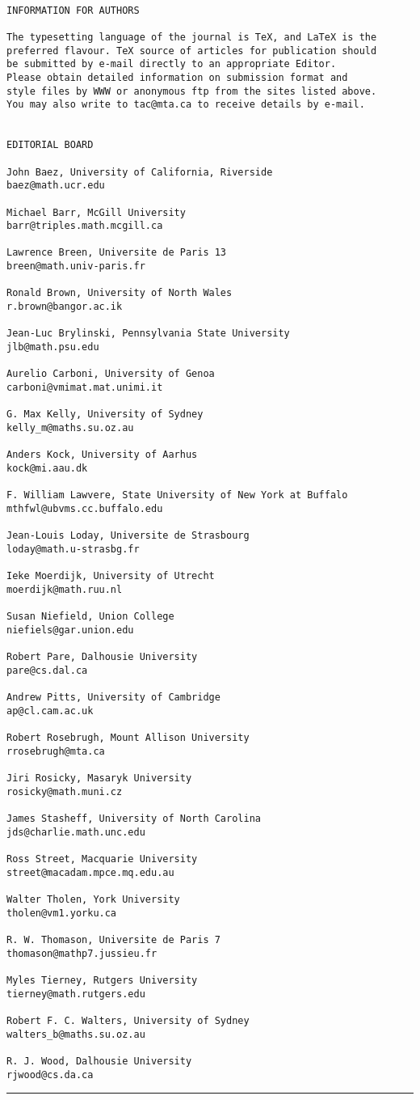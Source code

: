 \begin{verbatim}
 
INFORMATION FOR AUTHORS
 
The typesetting language of the journal is TeX, and LaTeX is the 
preferred flavour. TeX source of articles for publication should 
be submitted by e-mail directly to an appropriate Editor. 
Please obtain detailed information on submission format and 
style files by WWW or anonymous ftp from the sites listed above.
You may also write to tac@mta.ca to receive details by e-mail.
 
 
EDITORIAL BOARD
 
John Baez, University of California, Riverside
baez@math.ucr.edu
 
Michael Barr, McGill University
barr@triples.math.mcgill.ca
 
Lawrence Breen, Universite de Paris 13
breen@math.univ-paris.fr
 
Ronald Brown, University of North Wales 
r.brown@bangor.ac.ik
 
Jean-Luc Brylinski, Pennsylvania State University
jlb@math.psu.edu
 
Aurelio Carboni, University of Genoa
carboni@vmimat.mat.unimi.it
 
G. Max Kelly, University of Sydney
kelly_m@maths.su.oz.au
 
Anders Kock, University of Aarhus
kock@mi.aau.dk
 
F. William Lawvere, State University of New York at Buffalo
mthfwl@ubvms.cc.buffalo.edu
 
Jean-Louis Loday, Universite de Strasbourg
loday@math.u-strasbg.fr
 
Ieke Moerdijk, University of Utrecht
moerdijk@math.ruu.nl
 
Susan Niefield, Union College
niefiels@gar.union.edu
 
Robert Pare, Dalhousie University
pare@cs.dal.ca
 
Andrew Pitts, University of Cambridge
ap@cl.cam.ac.uk
 
Robert Rosebrugh, Mount Allison University
rrosebrugh@mta.ca
 
Jiri Rosicky, Masaryk University
rosicky@math.muni.cz
 
James Stasheff, University of North Carolina
jds@charlie.math.unc.edu
 
Ross Street, Macquarie University 
street@macadam.mpce.mq.edu.au
 
Walter Tholen, York University
tholen@vm1.yorku.ca
 
R. W. Thomason, Universite de Paris 7
thomason@mathp7.jussieu.fr
 
Myles Tierney, Rutgers University
tierney@math.rutgers.edu
 
Robert F. C. Walters, University of Sydney
walters_b@maths.su.oz.au
 
R. J. Wood, Dalhousie University
rjwood@cs.da.ca
\end{verbatim}
    
\par\noindent\rule{\textwidth}{0.4pt}

